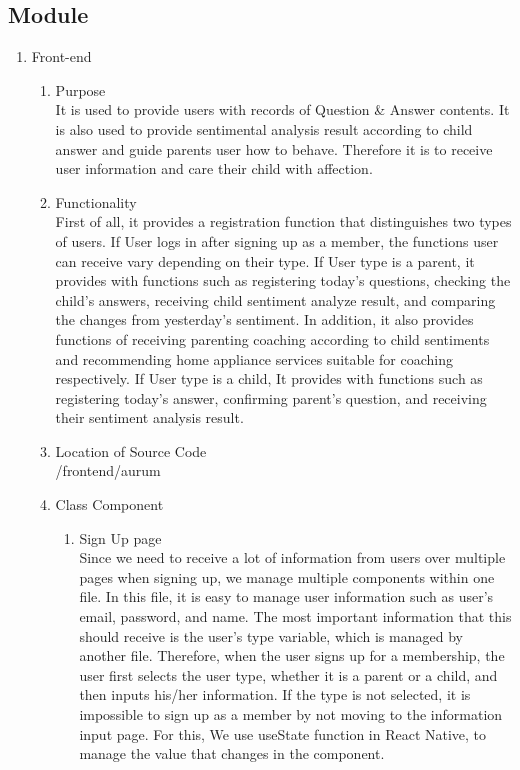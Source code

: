 \documentclass[conference]{IEEEtran}
\begin{document}
\subsection{Module}
\begin{enumerate}
    \item Front-end
       \begin{enumerate}
           \item Purpose
           \\It is used to provide users with records of Question \& Answer contents. It is also used to provide sentimental analysis result according to child answer and guide parents user how to behave. Therefore it is to receive user information and care their child with affection.
           \newline
           \item Functionality
           \\First of all, it provides a registration function that distinguishes two types of users. If User logs in after signing up as a member, the functions user can receive vary depending on their type. If User type is a parent, it provides with functions such as registering today's questions, checking the child's answers, receiving child sentiment analyze result, and comparing the changes from yesterday's sentiment. In addition, it also provides functions of receiving parenting coaching according to child sentiments and recommending home appliance services suitable for coaching respectively. If User type is a child, It provides with functions such as registering today's answer, confirming parent's question, and receiving their sentiment analysis result.
           \newline
           \item Location of Source Code
           \\/frontend/aurum
           \newline
           \item Class Component
           \begin{enumerate}
               \item Sign Up page
               \\Since we need to receive a lot of information from users over multiple pages when signing up, we manage multiple components within one file. In this file, it is easy to manage user information such as user's email, password, and name. The most important information that this should receive is the user's type variable, which is managed by another file. Therefore, when the user signs up for a membership, the user first selects the user type, whether it is a parent or a child, and then inputs his/her information. If the type is not selected, it is impossible to sign up as a member by not moving to the information input page. For this, We use useState function in React Native, to manage the value that changes in the component.

\end{enumerate}
\end{enumerate}
\end{enumerate}
\end{document}
